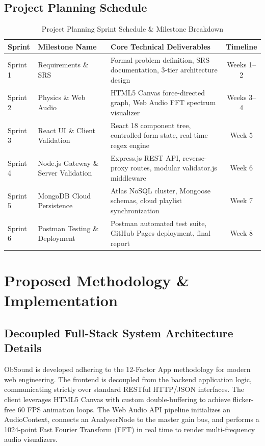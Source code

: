 \documentclass[12pt,a4paper,oneside]{report}
\begin{document}
\section{Project Planning Schedule}
\begin{table}[H]
\centering
\small
\caption{Project Planning Sprint Schedule \& Milestone Breakdown}
\label{tab:sprint}
\begin{tabularx}{\textwidth}{llXc}
\toprule
\textbf{Sprint} & \textbf{Milestone Name} & \textbf{Core Technical Deliverables} & \textbf{Timeline} \\
\midrule
Sprint 1 & Requirements \& SRS & Formal problem definition, SRS documentation, 3-tier architecture design & Weeks 1--2 \\
Sprint 2 & Physics \& Web Audio & HTML5 Canvas force-directed graph, Web Audio FFT spectrum visualizer & Weeks 3--4 \\
Sprint 3 & React UI \& Client Validation & React 18 component tree, controlled form state, real-time regex engine & Week 5 \\
Sprint 4 & Node.js Gateway \& Server Validation & Express.js REST API, reverse-proxy routes, modular validator.js middleware & Week 6 \\
Sprint 5 & MongoDB Cloud Persistence & Atlas NoSQL cluster, Mongoose schemas, cloud playlist synchronization & Week 7 \\
Sprint 6 & Postman Testing \& Deployment & Postman automated test suite, GitHub Pages deployment, final report & Week 8 \\
\bottomrule
\end{tabularx}
\end{table}

\chapter{Proposed Methodology \& Implementation}

\section{Decoupled Full-Stack System Architecture Details}
ObSound is developed adhering to the 12-Factor App methodology for modern web engineering. The frontend is decoupled from the backend application logic, communicating strictly over standard RESTful HTTP/JSON interfaces. The client leverages HTML5 Canvas with custom double-buffering to achieve flicker-free 60 FPS animation loops. The Web Audio API pipeline initializes an AudioContext, connects an AnalyserNode to the master gain bus, and performs a 1024-point Fast Fourier Transform (FFT) in real time to render multi-frequency audio visualizers.
\end{document}
